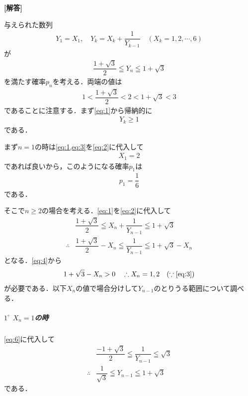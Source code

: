 \documentclass[../../main.tex]{subfiles}
\begin{document}
\begin{oframed}
  
\end{oframed}

{\bf [解答]}

与えられた数列
\begin{align}
  Y_1=X_1, \quad Y_k=X_k+\dfrac{1}{Y_{k-1}} \quad (X_k=1,2,\cdots,6) \label{eq:1}
\end{align}
が
\begin{align}
  \dfrac{1+\sqrt{3}}{2} \leqq Y_n \leqq 1+\sqrt{3} \label{eq:2}
\end{align}
を満たす確率$p_n$を考える．両端の値は
\begin{align}
  1 < \dfrac{1+\sqrt{3}}{2} < 2 <  1+\sqrt{3} < 3 \label{eq:3}
\end{align}
であることに注意する．まず\cref{eq:1}から帰納的に
\begin{align}
  Y_k \ge 1 \label{eq:4}
\end{align}
である．

まず$n=1$の時は\cref{eq:1,eq:3}を\cref{eq:2}に代入して
\begin{align}
  X_1 = 2
\end{align}
であれば良いから，このようになる確率$p_1$は
\begin{align}
  p_1 = \dfrac{1}{6}  \label{eq:5}
\end{align}
である．

そこで$n \ge 2$の場合を考える．\cref{eq:1}を\cref{eq:2}に代入して
\begin{align}
  & \dfrac{1+\sqrt{3}}{2} \leqq X_n+\dfrac{1}{Y_{n-1}} \leqq 1+\sqrt{3} \\
  \therefore
  & \dfrac{1+\sqrt{3}}{2} - X_n \leqq \dfrac{1}{Y_{n-1}} \leqq 1+\sqrt{3} - X_n \label{eq:6}
\end{align}
となる．\cref{eq:4}から
\begin{align}
  1+\sqrt{3} - X_n > 0 \quad \therefore X_n = 1, 2 \quad (\because\text{\cref{eq:3}})
\end{align}
が必要である．以下$X_n$の値で場合分けして$Y_{n-1}$のとりうる範囲について調べる．

\subparagraph{$1^{\circ}$ $X_n=1$の時}

\cref{eq:6}に代入して
\begin{align}
  & \dfrac{-1+\sqrt{3}}{2} \leqq \dfrac{1}{Y_{n-1}} \leqq \sqrt{3} \\
  \therefore
  & \dfrac{1}{\sqrt{3}} \leqq Y_{n-1} \leqq 1 + \sqrt{3} \label{eq:7}
\end{align}
である．
\end{document}
